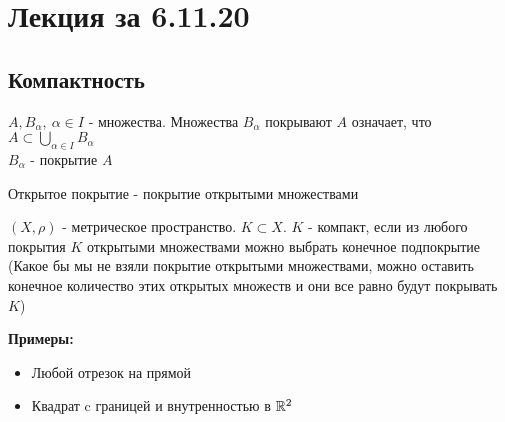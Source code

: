 \section{Лекция за 6.11.20}
\subsection{Компактность}
\begin{conj}
    $A, B_{\alpha}, \ {\alpha \in I}$ - множества. Множества $B_{\alpha}$ покрывают $A$
    означает, что $A \subset \bigcup\limits_{\alpha \in I} B_{\alpha}$ \\
    $B_{\alpha}$ - покрытие $A$
\end{conj}
\begin{conj}
    Открытое покрытие - покрытие открытыми множествами
\end{conj}
\begin{conj}
    $(X, \rho)$ - метрическое пространство. $K \subset X$.
    $K$ - компакт, если из любого покрытия $K$ открытыми множествами можно выбрать конечное подпокрытие 
    (Какое бы мы не взяли покрытие открытыми множествами, можно оставить конечное количество этих открытых множеств
    и они все равно будут покрывать $K$)
\end{conj}
\textbf{Примеры:} 
\begin{itemize}
    \item[] Любой отрезок на прямой
    \item[] Квадрат c границей и внутренностью в $\mathbb{R}^2$
\end{itemize}
